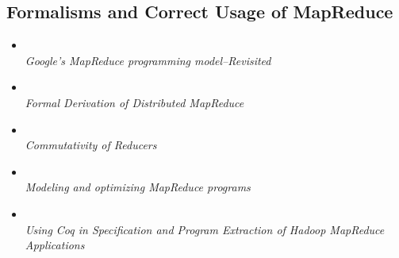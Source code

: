 \subsection{Formalisms and Correct Usage of MapReduce}
\begin{frame}[allowframebreaks]
  \begin{itemize}
    \item \citet[Science of Computer Programming][]{lammel2008google} \\
          \emph{Google's MapReduce programming model--Revisited}
    \item \citet[ABZ][]{pereverzeva2014formal} \\
          \emph{Formal Derivation of Distributed MapReduce}
    \item \citet[TACAS][]{chen2015commutativity} \\
          \emph{Commutativity of Reducers}
    \item \citet[Concurrency and Computation][]{dorre2015modeling} \\
          \emph{Modeling and optimizing MapReduce programs}
    \item \citet[SEFM][]{ono2011using} \\
          \emph{Using Coq in Specification and Program Extraction of Hadoop
          MapReduce Applications}
  \end{itemize}
\end{frame}
